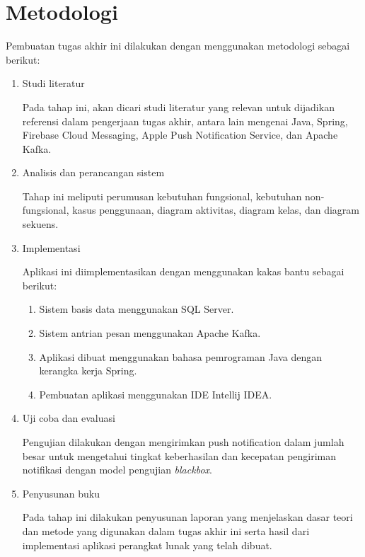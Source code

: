 \section {Metodologi}
\par Pembuatan tugas akhir ini dilakukan dengan menggunakan metodologi sebagai berikut:
\begin{enumerate}[listparindent=2.5em]
	\item Studi literatur
	\par Pada tahap ini, akan dicari studi literatur yang relevan untuk dijadikan referensi dalam pengerjaan tugas akhir, antara lain mengenai Java, Spring, Firebase Cloud Messaging, Apple Push Notification Service, dan Apache Kafka.
	\item Analisis dan perancangan sistem
	\par Tahap ini meliputi perumusan kebutuhan fungsional, kebutuhan non-fungsional, kasus penggunaan, diagram aktivitas, diagram kelas, dan diagram sekuens.
	\item Implementasi
	\par Aplikasi ini diimplementasikan dengan menggunakan kakas bantu sebagai berikut:
	\begin{enumerate}
		\item Sistem basis data menggunakan SQL Server.
		\item Sistem antrian pesan menggunakan Apache Kafka.
		\item Aplikasi dibuat menggunakan bahasa pemrograman Java dengan kerangka kerja Spring.
		\item Pembuatan aplikasi menggunakan IDE Intellij IDEA.
	\end{enumerate}
    \item Uji coba dan evaluasi
    \par Pengujian dilakukan dengan mengirimkan push notification dalam jumlah besar untuk mengetahui tingkat keberhasilan dan kecepatan pengiriman notifikasi dengan model pengujian \textit{blackbox}.
    \item Penyusunan buku
    \par Pada tahap ini dilakukan penyusunan laporan yang menjelaskan dasar teori dan metode yang digunakan dalam tugas akhir ini serta hasil dari implementasi aplikasi perangkat lunak yang telah dibuat.
\end{enumerate}

